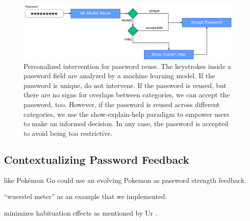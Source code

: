 \begin{figure}
	\centering
	\includegraphics[width=\linewidth]{figures/summary/flow-chart}
	\caption{Personalized intervention for password reuse. The keystrokes inside a password field are analyzed by a machine learning model. If the password is unique, do not intervene. If the password is reused, but there are no signs for overlaps between categories, we can accept the password, too. However, if the password is reused across different categories, we use the show-explain-help paradigm to empower users to make an informed decision. In any case, the password is accepted to avoid being too restrictive. }
	\label{fig:summary:flow-chart}
\end{figure}

 



\subsection{Contextualizing Password Feedback}

like \cite{Kroeze2012GamifyingAuthentication} Pokémon Go could use an evolving Pokemon as password strength feedback. 

``wuerstel meter'' as an example that we implemented.

minimizes habituation effects as mentioned by Ur \etal \cite{Ur2012HelpingUsersCreateBetterPasswords}.

